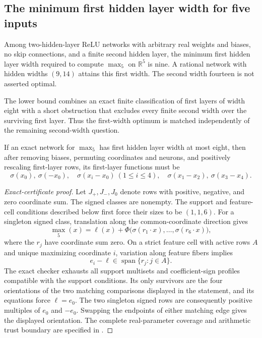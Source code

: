 
\subsection{The minimum first hidden layer width for five inputs}
\label{sec:first-five-nine}

\begin{theorem}\label{thm:first-five-nine}
Among two-hidden-layer ReLU networks with arbitrary real weights and
biases, no skip connections, and a finite second hidden layer, the minimum
first hidden layer width required to compute $\max_5$ on $\mathbb R^5$ is
nine. A rational network with hidden widths $(9,14)$ attains this first
width. The second width fourteen is not asserted optimal.
\end{theorem}

The lower bound combines an exact finite classification of first layers
of width eight with a short obstruction that excludes every finite second
width over the surviving first layer. Thus the first-width optimum is
matched independently of the remaining second-width question.

\begin{lemma}\label{lem:first-five-classification}
If an exact network for $\max_5$ has first hidden layer width at most eight,
then after removing biases, permuting coordinates and neurons, and
positively rescaling first-layer rows, its first-layer functions must be
\[
 \sigma(x_0),\ \sigma(-x_0),\quad
 \sigma(x_i-x_0)\ (1\le i\le4),\quad
 \sigma(x_1-x_2),\ \sigma(x_3-x_4).
\]
\end{lemma}

\begin{proof}[Exact-certificate proof]
Let $J_+,J_-,J_0$ denote rows with positive, negative, and zero coordinate
sum. The signed classes are nonempty. The support and feature-cell
conditions described below first force their sizes to be $(1,1,6)$.
For a singleton signed class, translation along the common-coordinate
direction gives
\[
 \max_5(x)=\ell(x)+\Phi\bigl(\sigma(r_1\cdot x),\ldots,
                                      \sigma(r_6\cdot x)\bigr),
\]
where the $r_j$ have coordinate sum zero. On a strict feature cell with
active rows $A$ and unique maximizing coordinate $i$, variation along
feature fibers implies
\[
 e_i-\ell\in\operatorname{span}\{r_j:j\in A\}.
\]
The exact checker exhausts all support multisets and coefficient-sign
profiles compatible with the support conditions. Its only survivors
are the four orientations of the two matching comparisons displayed in
the statement, and its equations force $\ell=e_0$. The two singleton
signed rows are consequently positive multiples of $e_0$ and $-e_0$.
Swapping the endpoints of either matching edge gives the displayed
orientation. The complete real-parameter coverage and arithmetic trust
boundary are specified in .
\end{proof}

